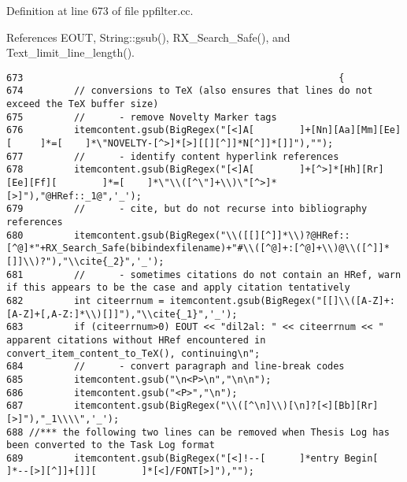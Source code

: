 Definition at line 673 of file ppfilter.cc.

References EOUT, String::gsub(), RX\_\-Search\_\-Safe(), and Text\_\-limit\_\-line\_\-length().



\footnotesize\begin{verbatim}673                                                        {
674         // conversions to TeX (also ensures that lines do not exceed the TeX buffer size)
675         //      - remove Novelty Marker tags
676         itemcontent.gsub(BigRegex("[<]A[        ]+[Nn][Aa][Mm][Ee][     ]*=[    ]*\"NOVELTY-[^>]*[>][[][^]]*N[^]]*[]]"),"");
677         //      - identify content hyperlink references
678         itemcontent.gsub(BigRegex("[<]A[        ]+[^>]*[Hh][Rr][Ee][Ff][        ]*=[    ]*\"\\([^\"]+\\)\"[^>]*[>]"),"@HRef::_1@",'_');
679         //      - cite, but do not recurse into bibliography references
680         itemcontent.gsub(BigRegex("\\([[][^]]*\\)?@HRef::[^@]*"+RX_Search_Safe(bibindexfilename)+"#\\([^@]+:[^@]+\\)@\\([^]]*[]]\\)?"),"\\cite{_2}",'_');
681         //      - sometimes citations do not contain an HRef, warn if this appears to be the case and apply citation tentatively
682         int citeerrnum = itemcontent.gsub(BigRegex("[[]\\([A-Z]+:[A-Z]+[,A-Z:]*\\)[]]"),"\\cite{_1}",'_');
683         if (citeerrnum>0) EOUT << "dil2al: " << citeerrnum << " apparent citations without HRef encountered in convert_item_content_to_TeX(), continuing\n";
684         //      - convert paragraph and line-break codes
685         itemcontent.gsub("\n<P>\n","\n\n");
686         itemcontent.gsub("<P>","\n");
687         itemcontent.gsub(BigRegex("\\([^\n]\\)[\n]?[<][Bb][Rr][>]"),"_1\\\\",'_');
688 //*** the following two lines can be removed when Thesis Log has been converted to the Task Log format
689         itemcontent.gsub(BigRegex("[<]!--[      ]*entry Begin[  ]*--[>][^]]+[]][        ]*[<]/FONT[>]"),"");

\end{verbatim}
